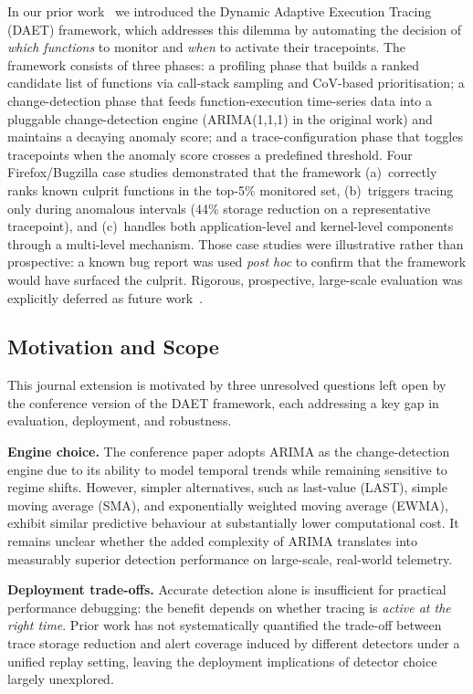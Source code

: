 \documentclass[pdflatex,sn-nature]{sn-jnl}
\theoremstyle{thmstyleone}%
\begin{document}
In our prior work~\cite{10197790} we introduced the Dynamic Adaptive Execution
Tracing (DAET) framework, which addresses this dilemma by automating the
decision of \emph{which functions} to monitor and \emph{when} to activate
their tracepoints.
The framework consists of three phases:
a profiling phase that builds a ranked candidate list of functions via
call-stack sampling and CoV-based prioritisation;
a change-detection phase that feeds function-execution time-series data into
a pluggable change-detection engine (ARIMA(1,1,1) in the original work)
and maintains a decaying anomaly score; and
a trace-configuration phase that toggles tracepoints when the anomaly score
crosses a predefined threshold.
Four Firefox/Bugzilla case studies demonstrated that the framework
(a)~correctly ranks known culprit functions in the top-5\% monitored set,
(b)~triggers tracing only during anomalous intervals (44\% storage reduction
on a representative tracepoint), and (c)~handles both application-level and
kernel-level components through a multi-level mechanism.
Those case studies were illustrative rather than prospective: a known bug
report was used \emph{post hoc} to confirm that the framework would have
surfaced the culprit.
Rigorous, prospective, large-scale evaluation was explicitly deferred as
future work~\cite{10197790}.

\subsection{Motivation and Scope}\label{sec:intro:extension}

This journal extension is motivated by three unresolved questions left open
by the conference version of the DAET framework, each addressing a key gap
in evaluation, deployment, and robustness.

\textbf{Engine choice.}
The conference paper adopts ARIMA as the change-detection engine due to its
ability to model temporal trends while remaining sensitive to regime shifts.
However, simpler alternatives, such as last-value (LAST), simple moving average
(SMA), and exponentially weighted moving average (EWMA), exhibit similar
predictive behaviour at substantially lower computational cost.
It remains unclear whether the added complexity of ARIMA translates into
measurably superior detection performance on large-scale, real-world telemetry.

\textbf{Deployment trade-offs.}
Accurate detection alone is insufficient for practical performance debugging:
the benefit depends on whether tracing is \emph{active at the right time}.
Prior work has not systematically quantified the trade-off between trace
storage reduction and alert coverage induced by different detectors under a
unified replay setting, leaving the deployment implications of detector choice
largely unexplored.
\end{document}
